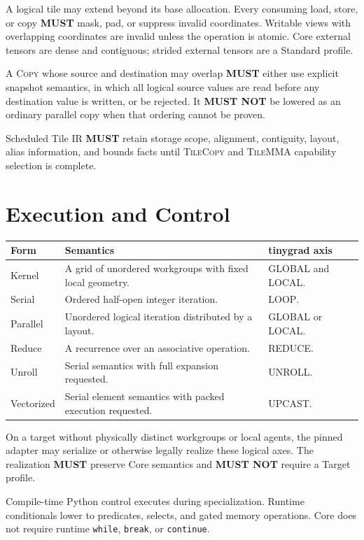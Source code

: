 \documentclass[10pt,letterpaper]{article}
\newcommand{\op}[1]{\textsc{#1}}
\newcommand{\must}{\textbf{MUST}}
\newcommand{\mustnot}{\textbf{MUST NOT}}
\begin{document}
A logical tile may extend beyond its base allocation. Every consuming load,
store, or copy \must{} mask, pad, or suppress invalid coordinates. Writable
views with overlapping coordinates are invalid unless the operation is atomic.
Core external tensors are dense and contiguous; strided external tensors are a
Standard profile.

A \op{Copy} whose source and destination may overlap \must{} either use explicit
snapshot semantics, in which all logical source values are read before any
destination value is written, or be rejected. It \mustnot{} be lowered as an
ordinary parallel copy when that ordering cannot be proven.

Scheduled Tile IR \must{} retain storage scope, alignment, contiguity, layout,
alias information, and bounds facts until \op{TileCopy} and \op{TileMMA}
capability selection is complete.

\section*{Execution and Control}

\begin{center}
\begin{tabularx}{\textwidth}{@{}lYY@{}}
\toprule
\textbf{Form} & \textbf{Semantics} & \textbf{tinygrad axis} \\
\midrule
Kernel & A grid of unordered workgroups with fixed local geometry. &
\op{GLOBAL} and \op{LOCAL}. \\
Serial & Ordered half-open integer iteration. & \op{LOOP}. \\
Parallel & Unordered logical iteration distributed by a layout. & \op{GLOBAL}
or \op{LOCAL}. \\
Reduce & A recurrence over an associative operation. & \op{REDUCE}. \\
Unroll & Serial semantics with full expansion requested. & \op{UNROLL}. \\
Vectorized & Serial element semantics with packed execution requested. &
\op{UPCAST}. \\
\bottomrule
\end{tabularx}
\end{center}

On a target without physically distinct workgroups or local agents, the pinned
adapter may serialize or otherwise legally realize these logical axes. The
realization \must{} preserve Core semantics and \mustnot{} require a Target
profile.

Compile-time Python control executes during specialization. Runtime
conditionals lower to predicates, selects, and gated memory operations. Core
does not require runtime \texttt{while}, \texttt{break}, or \texttt{continue}.
\end{document}
